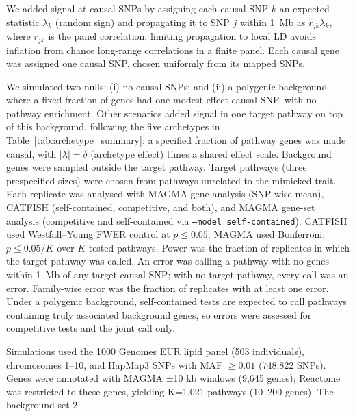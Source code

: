 We added signal at causal SNPs by assigning each causal SNP $k$ an expected statistic $\lambda_k$ (random sign) and propagating it to SNP $j$ within 1~Mb as $r_{jk}\lambda_k$, where $r_{jk}$ is the panel correlation; limiting propagation to local LD avoids inflation from chance long-range correlations in a finite panel. Each causal gene was assigned one causal SNP, chosen uniformly from its mapped SNPs. 

We simulated two nulls: (i) no causal SNPs; and (ii) a polygenic background where a fixed fraction of genes had one modest-effect causal SNP, with no pathway enrichment. Other scenarios added signal in one target pathway on top of this background, following the five archetypes in Table~\ref{tab:archetype_summary}: a specified fraction of pathway genes was made causal, with $|\lambda|=\delta$ (archetype effect) times a shared effect scale. Background genes were sampled outside the target pathway. Target pathways (three prespecified sizes) were chosen from pathways unrelated to the mimicked trait. Each replicate was analysed with MAGMA gene analysis (SNP-wise mean), CATFISH (self-contained, competitive, and both), and MAGMA gene-set analysis (competitive and self-contained via \texttt{--model self-contained}). CATFISH used Westfall--Young FWER control at $p\le0.05$; MAGMA used Bonferroni, $p\le0.05/K$ over $K$ tested pathways. Power was the fraction of replicates in which the target pathway was called. An error was calling a pathway with no genes within 1~Mb of any target causal SNP; with no target pathway, every call was an error. Family-wise error was the fraction of replicates with at least one error. Under a polygenic background, self-contained tests are expected to call pathways containing truly associated background genes, so errors were assessed for competitive tests and the joint call only.

Simulations used the 1000 Genomes EUR lipid panel (503 individuals), chromosomes 1–10, and HapMap3 SNPs with MAF $\ge0.01$ (748,822 SNPs). Genes were annotated with MAGMA ±10 kb windows (9,645 genes); Reactome was restricted to these genes, yielding K=1,021 pathways (10–200 genes). The background set 2%

